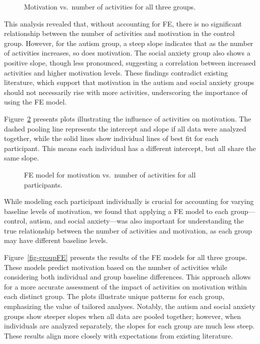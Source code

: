 \documentclass[
  letterpaper,
  number,
  review,
  3p]{elsarticle}
\begin{document}
\begin{figure}[H]


\caption{\label{fig-Analy}Motivation vs.~number of activities for all
three groups.}

\end{figure}%

This analysis revealed that, without accounting for FE, there is no
significant relationship between the number of activities and motivation
in the control group. However, for the autism group, a steep slope
indicates that as the number of activities increases, so does
motivation. The social anxiety group also shows a positive slope, though
less pronounced, suggesting a correlation between increased activities
and higher motivation levels. These findings contradict existing
literature, which support that motivation in the autism and social
anxiety groups should not necessarily rise with more activities,
underscoring the importance of using the FE model.

Figure~\ref{fig-FEAnaly} presents plots illustrating the influence of
activities on motivation. The dashed pooling line represents the
intercept and slope if all data were analyzed together, while the solid
lines show individual lines of best fit for each participant. This means
each individual has a different intercept, but all share the same slope.

\begin{figure}[H]


\caption{\label{fig-FEAnaly}FE model for motivation vs.~number of
activities for all participants.}

\end{figure}%

While modeling each participant individually is crucial for accounting
for varying baseline levels of motivation, we found that applying a FE
model to each group---control, autism, and social anxiety---was also
important for understanding the true relationship between the number of
activities and motivation, as each group may have different baseline
levels.

Figure~\ref{fig-groupFE} presents the results of the FE models for all
three groups. These models predict motivation based on the number of
activities while considering both individual and group baseline
differences. This approach allows for a more accurate assessment of the
impact of activities on motivation within each distinct group. The plots
illustrate unique patterns for each group, emphasizing the value of
tailored analyses. Notably, the autism and social anxiety groups show
steeper slopes when all data are pooled together; however, when
individuals are analyzed separately, the slopes for each group are much
less steep. These results align more closely with expectations from
existing literature.
\end{document}
